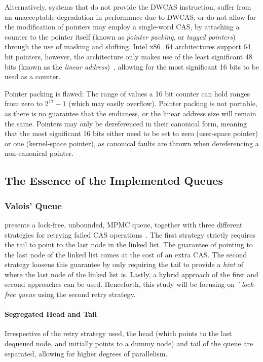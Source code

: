 Alternatively, systems that do not provide the DWCAS instruction, suffer from
an unacceptable degradation in performance due to DWCAS, or do not allow for
the modification of pointers may employ a single-word CAS, by attaching a
counter to the pointer itself (known as \emph{pointer packing}, or \emph{tagged
pointers}) through the use of masking and shifting. Intel x86\_64 architectures support 64 bit pointers, however, the
architecture only makes use of the least significant 48 bits (known as the
\emph{linear address})~\citep[Section~3.3.7.1]{intel2021system}, allowing for
the most significant 16 bits to be used as a counter.

Pointer packing is flawed: 
The range of values a 16 bit counter can hold ranges from zero to $2^{17}-1$
(which may easily overflow).
Pointer packing is not portable, as there is no guarantee that the endianess,
or the linear address size will remain the same. 
Pointers may only be dereferenced in their canonical form, meaning that the
most significant 16 bits either need to be set to zero (user-space pointer) or
one (kernel-space pointer), as canonical faults are thrown when
dereferencing a non-canonical pointer.
\pagebreak
\subsection{The Essence of the Implemented Queues}
\subsubsection{Valois' Queue}
\citeauthor{valois1994queues} presents a lock-free, unbounded, MPMC queue,
together with three different strategies for retrying failed CAS operations~\citep{valois1994queues}.
The first strategy strictly requires the tail to point to the last node in the
linked list. The guarantee of pointing to the last node of the linked list
comes at the cost of an extra CAS. The second strategy loosens
this guarantee by only requiring the tail to provide a \emph{hint} of where the
last node of the linked list is. Lastly, a hybrid approach of the first and
second approaches can be used. Henceforth, this study will be focusing on
\emph{\citeauthor{valois1994queues}' lock-free queue} using the second retry strategy.

\paragraph{Segregated Head and Tail}
Irrespective of the retry strategy used, the head (which points to the last
dequeued node, and initially points to a dummy node) and tail of the queue are
separated, allowing for higher degrees of parallelism.


